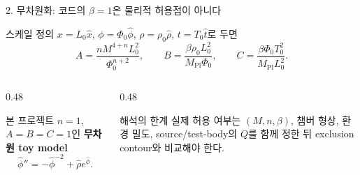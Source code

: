 \documentclass[10pt,aspectratio=169]{beamer}
\begin{document}
\begin{frame}{2. 무차원화: 코드의 $\beta=1$은 물리적 허용점이 아니다}
 \begin{block}{스케일 정의}
  $x=L_0\hat x$, $\phi=\Phi_0\hat\phi$, $\rho=\rho_0\hat\rho$, $t=T_0\hat t$로 두면
  \[
   A=\frac{nM^{4+n}L_0^2}{\Phi_0^{n+2}},\qquad
   B=\frac{\beta\rho_0L_0^2}{M_{\mathrm{Pl}}\Phi_0},\qquad
   C=\frac{\beta\Phi_0T_0^2}{M_{\mathrm{Pl}}L_0^2}.
  \]
 \end{block}
 \begin{columns}[T]
  \begin{column}{0.48\textwidth}
   \begin{block}{본 프로젝트}
    $n=1$, $A=B=C=1$인 \textbf{무차원 toy model}
    \[
     \hat\phi''=-\hat\phi^{-2}+\hat\rho e^{\hat\phi}.
    \]
   \end{block}
  \end{column}
  \begin{column}{0.48\textwidth}
   \begin{alertblock}{해석의 한계}
    실제 허용 여부는 $(M,n,\beta)$, 챔버 형상, 환경 밀도, source/test-body의 $Q$를 함께 정한 뒤 exclusion contour와 비교해야 한다.
   \end{alertblock}
  \end{column}
 \end{columns}
\end{frame}
\end{document}
